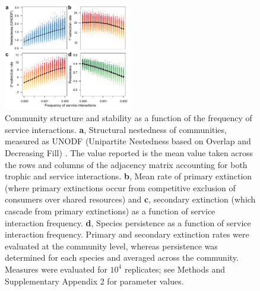 \documentclass[twocolumn,preprintnumbers,amsmath,amssymb,superscriptaddress,linenumbers]{revtex4-1}
\begin{document}
\begin{figure}[h!]
\centering
\includegraphics[width=0.5\textwidth]{fig_nested4.pdf}
\vspace{-6mm}
\caption{
Community structure and stability as a function of the frequency of service interactions.
\textbf{a}, Structural nestedness of communities, measured as UNODF (Unipartite Nestedness based on Overlap and Decreasing Fill) \cite{Cantor2017}.
The value reported is the mean value taken across the rows and columns of the adjacency matrix accounting for both trophic and service interactions.
\textbf{b}, Mean rate of primary extinction  (where primary extinctions occur from competitive exclusion of consumers over shared resources) and \textbf{c}, secondary extinction (which cascade from primary extinctions) as a function of service interaction frequency.
\textbf{d}, Species persistence as a function of service interaction frequency.
Primary and secondary extinction rates were evaluated at the community level, whereas persistence was determined for each species and averaged across the community.
Measures were evaluated for $10^4$ replicates; see Methods and Supplementary Appendix 2 for parameter values.
\vspace{-6mm}
}
\label{fig:nest}
\end{figure}
\end{document}

